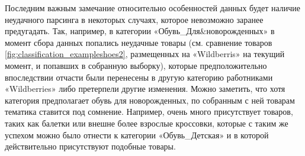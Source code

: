 \documentclass[a4paper,12pt]{extarticle}
\begin{document}
Последним важным замечание относительно особенностей данных будет наличие неудачного парсинга в некоторых случаях, которое невозможно заранее предугадать. Так, например, в категории «Обувь\_Для\&новорожденных» в момент сбора данных попались неудачные товары (см. сравнение товаров \ref{fig:classification_exampleshoes2}, размещенных на «Wildberris» на текущий момент, и попавших в собранную выборку), которые предположительно впоследствии отчасти были перенесены в другую категорию работниками «Wildberries» либо претерпели другие изменения. Можно заметить, что хотя категория предполагает обувь для новорожденных, по собранным с ней товарам тематика ставится под сомнение. Например, очень много присутствует товаров, таких как балетки или внешне более взрослые кроссовки, которые с таким же успехом можно было отнести к категории «Обувь\_Детская» и в которой действительно присутствуют подобные товары.
\end{document}
